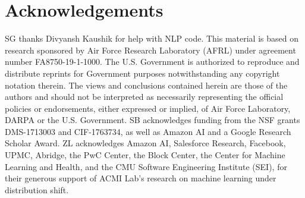 \documentclass{article}
\begin{document}
\section*{Acknowledgements}

SG thanks Divyansh Kaushik for help with NLP code.  
This material is based on research sponsored by Air Force Research Laboratory (AFRL) under agreement number FA8750-19-1-1000. The U.S. Government is authorized to reproduce and distribute reprints for Government purposes notwithstanding any copyright notation therein. 
The views and conclusions contained herein are those of the authors and should not be interpreted as necessarily representing the official policies or endorsements, either expressed or implied, of Air Force Laboratory, DARPA or the U.S. Government. 
SB acknowledges funding from the NSF grants DMS-1713003 and CIF-1763734, as well as Amazon AI and a Google Research Scholar Award. 
ZL acknowledges Amazon AI, Salesforce Research, Facebook, UPMC, Abridge, the PwC Center, the Block Center, the Center for Machine Learning and Health, and the CMU Software Engineering Institute (SEI),
for their generous support of ACMI Lab's research on machine learning under distribution shift.




\newpage
\appendix

\end{document}
